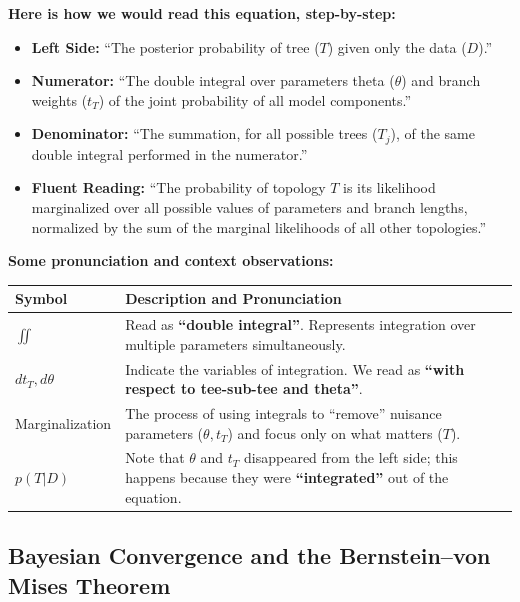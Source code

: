 \textbf{Here is how we would read this equation, step-by-step:}

\begin{itemize}
    \item \textbf{Left Side:} ``The posterior probability of tree ($T$) given only the data ($D$).''
    \item \textbf{Numerator:} ``The double integral over parameters theta ($\theta$) and branch weights ($t_T$) of the joint probability of all model components.''
    \item \textbf{Denominator:} ``The summation, for all possible trees ($T_j$), of the same double integral performed in the numerator.''
    \item \textbf{Fluent Reading:} ``The probability of topology $T$ is its likelihood marginalized over all possible values of parameters and branch lengths, normalized by the sum of the marginal likelihoods of all other topologies.''
\end{itemize}

\vspace{0.5cm}

\textbf{Some pronunciation and context observations:}

\begin{center}
\renewcommand{\arraystretch}{1.5}
\begin{tabular}{lp{10cm}}
\hline
\textbf{Symbol} & \textbf{Description and Pronunciation} \\ \hline
$\iint$ & Read as \textbf{``double integral''}. Represents integration over multiple parameters simultaneously. \\
$dt_T, d\theta$ & Indicate the variables of integration. We read as \textbf{``with respect to tee-sub-tee and theta''}. \\
Marginalization & The process of using integrals to ``remove'' nuisance parameters ($\theta, t_T$) and focus only on what matters ($T$). \\
$p(T|D)$ & Note that $\theta$ and $t_T$ disappeared from the left side; this happens because they were \textbf{``integrated''} out of the equation. \\ \hline
\end{tabular}
\end{center}

\subsection{Bayesian Convergence and the Bernstein--von Mises Theorem}

